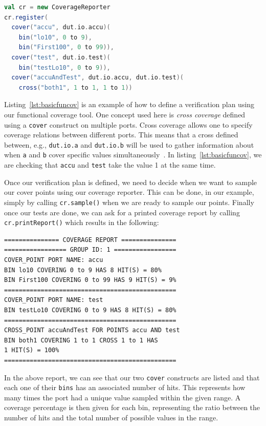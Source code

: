 \documentclass[conference]{IEEEtran}
\begin{document}
\begin{lstlisting}[captionpos=b,caption={Small Verification Plan defined using 3 \texttt{cover} constructs, including one cross coverage construct},label={lst:basicfuncov},language=scala]
val cr = new CoverageReporter
cr.register(
  cover("accu", dut.io.accu)(
    bin("lo10", 0 to 9),
    bin("First100", 0 to 99)),
  cover("test", dut.io.test)(
    bin("testLo10", 0 to 9)),
  cover("accuAndTest", dut.io.accu, dut.io.test)(
    cross("both1", 1 to 1, 1 to 1))
\end{lstlisting}

Listing~\ref{lst:basicfuncov} is an example of how to define a verification plan using our functional coverage tool. 
One concept used here is \textit{cross coverage} defined using a \texttt{cover} construct on multiple ports. 
Cross coverage allows one to specify coverage relations between different ports. 
This means that a cross defined between, e.g., \texttt{dut.io.a} and \texttt{dut.io.b} will be used to gather information about when \texttt{a} and \texttt{b} cover specific values simultaneously~\cite{spear2008systemverilog}.
In listing~\ref{lst:basicfuncov}, we are checking that \texttt{accu} and \texttt{test} take the value 1 at the same time.

Once our verification plan is defined, we need to decide when we want to sample our cover points using our coverage reporter.
This can be done, in our example, simply by calling \texttt{cr.sample()} when we are ready to sample our points. 
Finally once our tests are done, we can ask for a printed coverage report by calling \texttt{cr.printReport()} which results in the following: 
\begin{verbatim}
=============== COVERAGE REPORT ===============
================= GROUP ID: 1 =================
COVER_POINT PORT NAME: accu
BIN lo10 COVERING 0 to 9 HAS 8 HIT(S) = 80%
BIN First100 COVERING 0 to 99 HAS 9 HIT(S) = 9%
===============================================
COVER_POINT PORT NAME: test
BIN testLo10 COVERING 0 to 9 HAS 8 HIT(S) = 80%
===============================================
CROSS_POINT accuAndTest FOR POINTS accu AND test
BIN both1 COVERING 1 to 1 CROSS 1 to 1 HAS
1 HIT(S) = 100%
===============================================
\end{verbatim}
In the above report, we can see that our two \texttt{cover} constructs are listed and that each one of their \texttt{bins} has an associated number of hits. 
This represents how many times the port had a unique value sampled within the given range. 
A coverage percentage is then given for each bin, representing the ratio between the number of hits and the total number of possible values in the range.
\end{document}
